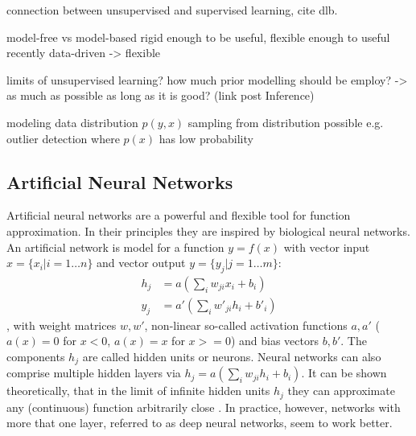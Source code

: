 		connection between unsupervised and supervised learning, cite dlb.

		model-free vs model-based
		rigid enough to be useful, flexible enough to useful
		recently data-driven -> flexible

		limits of unsupervised learning?
		how much prior modelling should be employ?
		-> as much as possible as long as it is good? (link post Inference)

		modeling data distribution $p(y, x)$
		sampling from distribution possible
		e.g. outlier detection where $p(x)$ has low probability


	\subsection{Artificial Neural Networks}\label{sec:neuralnetworks}
		Artificial neural networks are a powerful and flexible tool for function approximation. In their principles they are inspired by biological neural networks. An artificial network is model for a function $y = f(x)$ with vector input $x = \{ x_i | i = 1 \ldots n \}$ and vector output $y = \{ y_j | j = 1 \ldots m \}$:
		\begin{equation} \label{eq1}
			\begin{split}
				h_j & =  a (\sum_i w_{ji} x_i + b_i)  \\
				y_j & =  a' (\sum_i w'_{ji} h_i + b'_i)
			\end{split}
		\end{equation},
		with weight matrices $w, w'$, non-linear so-called activation functions $a, a'$ (\eg $a(x)=0$ for $x<0$, $a(x)=x$ for $x>=0$) and bias vectors $b, b'$.
		The components $h_j$ are called hidden units or neurons. Neural networks can also comprise multiple hidden layers via $h_j  =  a (\sum_i w_{ji} h_i + b_i)$.
		It can be shown theoretically, that in the limit of infinite hidden units $h_j$ they can approximate any (continuous) function arbitrarily close \cite{cybenko89approx} .
		In practice, however, networks with more that one layer, referred to as deep neural networks, seem to work better.

